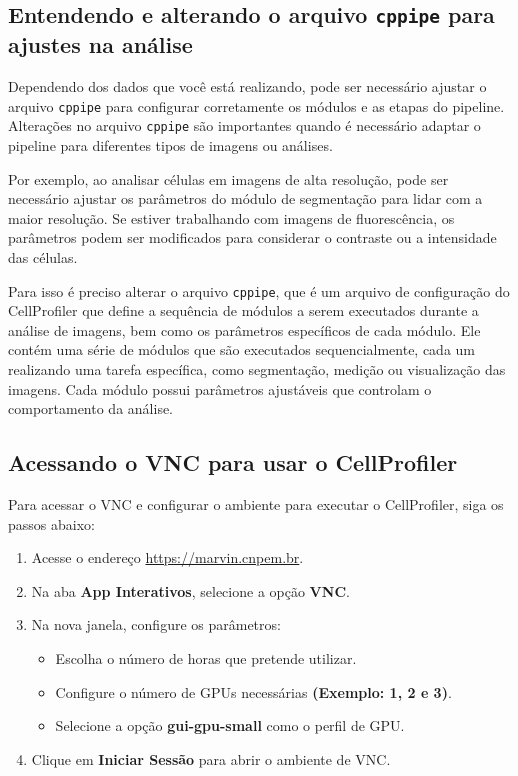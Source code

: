 \documentclass{article}
\begin{document}
\subsection{Entendendo e alterando o arquivo \texttt{cppipe} para ajustes na análise}
Dependendo dos dados que você está realizando, pode ser necessário ajustar o arquivo \texttt{cppipe} para configurar corretamente os módulos e as etapas do pipeline. Alterações no arquivo \texttt{cppipe} são importantes quando é necessário adaptar o pipeline para diferentes tipos de imagens ou análises.

Por exemplo, ao analisar células em imagens de alta resolução, pode ser necessário ajustar os parâmetros do módulo de segmentação para lidar com a maior resolução. Se estiver trabalhando com imagens de fluorescência, os parâmetros podem ser modificados para considerar o contraste ou a intensidade das células.

Para isso é preciso alterar o arquivo \texttt{cppipe}, que é um arquivo de configuração do CellProfiler que define a sequência de módulos a serem executados durante a análise de imagens, bem como os parâmetros específicos de cada módulo. Ele contém uma série de módulos que são executados sequencialmente, cada um realizando uma tarefa específica, como segmentação, medição ou visualização das imagens. Cada módulo possui parâmetros ajustáveis que controlam o comportamento da análise.



\subsection{Acessando o VNC para usar o CellProfiler}  

Para acessar o VNC e configurar o ambiente para executar o CellProfiler, siga os passos abaixo:  

\begin{enumerate}  
  \item Acesse o endereço \href{https://marvin.cnpem.br}{https://marvin.cnpem.br}.  
  \item Na aba \textbf{App Interativos}, selecione a opção \textbf{VNC}.  
  \item Na nova janela, configure os parâmetros:  
  \begin{itemize}  
    \item Escolha o número de horas que pretende utilizar.  
    \item Configure o número de GPUs necessárias \textbf{(Exemplo: 1, 2 e 3)}.  
    \item Selecione a opção \textbf{gui-gpu-small} como o perfil de GPU.  
  \end{itemize}  
  \item Clique em \textbf{Iniciar Sessão} para abrir o ambiente de VNC.  
\end{enumerate}  
\end{document}
